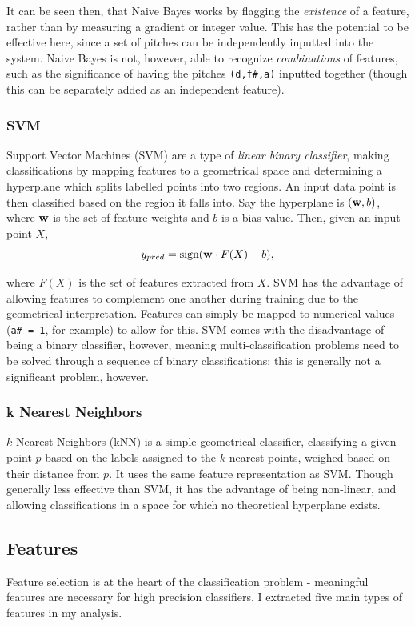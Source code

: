 \documentclass[12pt]{article}
\begin{document}
It can be seen then, that Naive Bayes works by flagging the \emph{existence} of a feature, rather than by measuring a gradient or integer value. This has the potential to be effective here, since a set of pitches can be independently inputted into the system. Naive Bayes is not, however, able to recognize \emph{combinations} of features, such as the significance of having the pitches \texttt{(d,f\#,a)} inputted together (though this can be separately added as an independent feature).

\subsubsection{SVM}
Support Vector Machines (SVM) are a type of \emph{linear binary classifier}, making classifications by mapping features to a geometrical space and determining a hyperplane which splits labelled points into two regions. An input data point is then classified based on the region it falls into. Say the hyperplane is $(\bold{w},b)$, where $\bold{w}$ is the set of feature weights and $b$ is a bias value. Then, given an input point $X$, 
$$y_{pred} = \text{sign}(\bold{w} \cdot F(X) - b),$$

where $F(X)$ is the set of features extracted from $X$. SVM has the advantage of allowing features to complement one another during training due to the geometrical interpretation. Features can simply be mapped to numerical values (\texttt{a\# = 1}, for example) to allow for this. SVM comes with the disadvantage of being a binary classifier, however, meaning multi-classification problems need to be solved through a sequence of binary classifications; this is generally not a significant problem, however.

\subsubsection{k Nearest Neighbors}
$k$ Nearest Neighbors (kNN) is a simple geometrical classifier, classifying a given point $p$ based on the labels assigned to the $k$ nearest points, weighed based on their distance from $p$. It uses the same feature representation as SVM. Though generally less effective than SVM, it has the advantage of being non-linear, and allowing classifications in a space for which no theoretical hyperplane exists.

\subsection{Features}
Feature selection is at the heart of the classification problem - meaningful features are necessary for high precision classifiers. I extracted five main types of features in my analysis.
\end{document}
